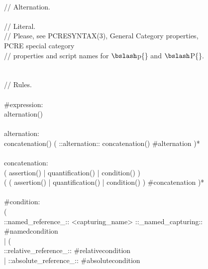 \begin{figure}
\begin{bigbigpre}
 \\
// Alternation. \\
 \\
// Literal. \\
// Please, see PCRESYNTAX(3), General Category properties, PCRE special category \\
// properties and script names for \(\bslash\)p\{\} and \(\bslash\)P\{\}. \\
 \\
 \\
// Rules. \\
 \\
#expression: \\
    alternation() \\
 \\
alternation: \\
    concatenation() ( ::alternation:: concatenation() #alternation )* \\
 \\
concatenation: \\
    (   assertion() | quantification() | condition() ) \\
    ( ( assertion() | quantification() | condition() ) #concatenation )* \\
 \\
#condition: \\
    ( \\
        ::named_reference_:: <capturing_name> ::_named_capturing:: #namedcondition \\
      | ( \\
            ::relative_reference_:: #relativecondition \\
          | ::absolute_reference_:: #absolutecondition \\

\end{bigbigpre}
\end{figure}
